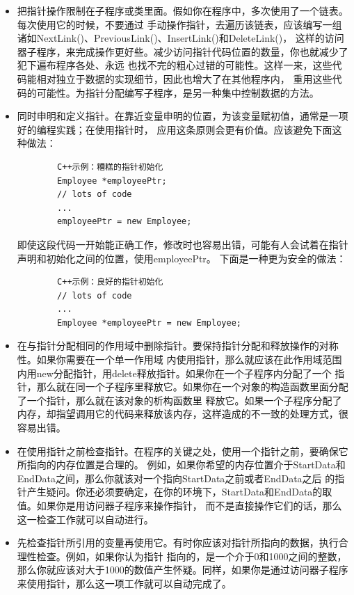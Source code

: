 \documentclass{article}
\begin{document}
\begin{itemize}
    \item 把指针操作限制在子程序或类里面。假如你在程序中，多次使用了一个链表。每次使用它的时候，不要通过
    手动操作指针，去遍历该链表，应该编写一组诸如NextLink()、PreviousLink()、InsertLink()和DeleteLink()，
    这样的访问器子程序，来完成操作更好些。减少访问指针代码位置的数量，你也就减少了犯下遍布程序各处、永远
    也找不完的粗心过错的可能性。这样一来，这些代码能相对独立于数据的实现细节，因此也增大了在其他程序内，
    重用这些代码的可能性。为指针分配编写子程序，是另一种集中控制数据的方法。
    \item 同时申明和定义指针。在靠近变量申明的位置，为该变量赋初值，通常是一项好的编程实践；在使用指针时，
    应用这条原则会更有价值。应该避免下面这种做法：
    \begin{lstlisting}
        C++示例：糟糕的指针初始化
        Employee *employeePtr;
        // lots of code
        ...
        employeePtr = new Employee;
    \end{lstlisting}
    即使这段代码一开始能正确工作，修改时也容易出错，可能有人会试着在指针声明和初始化之间的位置，使用employeePtr。
    下面是一种更为安全的做法：
    \begin{lstlisting}
        C++示例：良好的指针初始化
        // lots of code
        ...
        Employee *employeePtr = new Employee;
    \end{lstlisting}
    \item 在与指针分配相同的作用域中删除指针。要保持指针分配和释放操作的对称性。如果你需要在一个单一作用域
    内使用指针，那么就应该在此作用域范围内用new分配指针，用delete释放指针。如果你在一个子程序内分配了一个
    指针，那么就在同一个子程序里释放它。如果你在一个对象的构造函数里面分配了一个指针，那么就在该对象的析构函数里
    释放它。如果一个子程序分配了内存，却指望调用它的代码来释放该内存，这样造成的不一致的处理方式，很容易出错。
    \item 在使用指针之前检查指针。在程序的关键之处，使用一个指针之前，要确保它所指向的内存位置是合理的。
    例如，如果你希望的内存位置介于StartData和EndData之间，那么你就该对一个指向StartData之前或者EndData之后
    的指针产生疑问。你还必须要确定，在你的环境下，StartData和EndData的取值。如果你是用访问器子程序来操作指针，
    而不是直接操作它们的话，那么这一检查工作就可以自动进行。
    \item 先检查指针所引用的变量再使用它。有时你应该对指针所指向的数据，执行合理性检查。例如，如果你认为指针
    指向的，是一个介于0和1000之间的整数，那么你就应该对大于1000的数值产生怀疑。同样，如果你是通过访问器子程序
    来使用指针，那么这一项工作就可以自动完成了。

\end{itemize}
\end{document}
